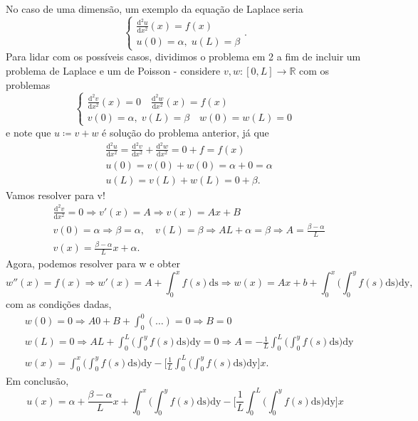 \documentclass[../pde_notes.tex]{subfiles}
\begin{document}
\begin{example}
	No caso de uma dimensão, um exemplo da equação de Laplace seria
	\[
		\left\{\begin{array}{ll}
			\frac{\mathrm{d}^{2}u}{\mathrm{d}x^{2}}(x) = f(x) \\
			u(0) = \alpha ,\; u(L) = \beta
		\end{array}\right..
	\]
	Para lidar com os possíveis casos, dividimos o problema em 2 a fim de incluir um problema de Laplace e um de Poisson - considere \(v, w:[0, L]\rightarrow \mathbb{R}\) com os problemas
	\[
		\left\{\begin{array}{ll}
			\frac{\mathrm{d}^{2}v}{\mathrm{d}x^{2}}(x) = 0 \quad \frac{\mathrm{d}^{2}w}{\mathrm{d}x^{2}}(x) = f(x) \\
			v(0) = \alpha ,\; v(L) = \beta  \quad w(0)=w(L)=0
		\end{array}\right.
	\]
	e note que \(u\coloneqq v+w\) é solução do problema anterior, já que
	\begin{align*}
		 & \frac{\mathrm{d}^{2}u}{\mathrm{d}x^{2}} = \frac{\mathrm{d}^{2}v}{\mathrm{d}x^{2}} + \frac{\mathrm{d}^{2}w}{\mathrm{d}x^{2}} = 0 + f = f(x) \\
		 & u(0) = v(0) + w(0) = \alpha + 0 = \alpha                                                                                                   \\
		 & u(L) = v(L) + w(L) = 0 + \beta .
	\end{align*}
	Vamos resolver para v!
	\begin{align*}
		 & \frac{\mathrm{d}^{2}v}{\mathrm{d}x^{2}} = 0 \Rightarrow v'(x) = A \Rightarrow v(x) = Ax + B                                               \\
		 & v(0) = \alpha  \Rightarrow \beta  = \alpha, \quad v(L) = \beta  \Rightarrow AL + \alpha  = \beta \Rightarrow A = \frac{\beta -\alpha }{L} \\
		 & v(x) = \frac{\beta - \alpha }{L}x + \alpha .
	\end{align*}
	Agora, podemos resolver para w e obter
	\[
		w''(x) = f(x) \Rightarrow w'(x) = A + \int_{0}^{x}f(s) \mathrm{ds} \Rightarrow w(x) = Ax + b + \int_{0}^{x}\biggl(\int_{0}^{y}f(s) \mathrm{ds}\biggr) \mathrm{dy},
	\]
	com as condições dadas,
	\begin{align*}
		 & w(0) = 0 \Rightarrow A0 + B + \int_{0}^{0} (\dotsc ) = 0 \Rightarrow B = 0                                                                                                                      \\
		 & w(L) = 0 \Rightarrow AL + \int_{0}^{L}\biggl(\int_{0}^{y}f(s) \mathrm{ds}\biggr) \mathrm{dy} = 0 \Rightarrow A = -\frac{1}{L}\int_{0}^{L}\biggl(\int_{0}^{y}f(s) \mathrm{ds}\biggr) \mathrm{dy} \\
		 & w(x) = \int_{0}^{x}\biggl(\int_{0}^{y}f(s) \mathrm{ds}\biggr) \mathrm{dy} - \biggl[\frac{1}{L}\int_{0}^{L}\biggl(\int_{0}^{y}f(s) \mathrm{ds}\biggr) \mathrm{dy}\biggr]x.
	\end{align*}
	Em conclusão,
	\[
		u(x) = \alpha  + \frac{\beta -\alpha }{L}x + \int_{0}^{x}\biggl(\int_{0}^{y}f(s) \mathrm{ds}\biggr) \mathrm{dy} - \biggl[\frac{1}{L}\int_{0}^{L}\biggl(\int_{0}^{y}f(s) \mathrm{ds}\biggr) \mathrm{dy}\biggr]x
	\]


\end{example}
\end{document}
